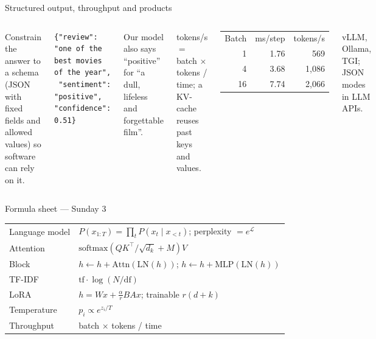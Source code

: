 \documentclass[aspectratio=169,11pt]{beamer}
\begin{document}
\begin{frame}[fragile]{Structured output, throughput and products}
\begin{columns}[T]
\begin{bdef}
Constrain the answer to a schema (JSON with fixed fields and allowed values) so software can rely on it.
\end{bdef}
\begin{bcode}
\begin{lstlisting}
{"review": "one of the best movies of the year",
 "sentiment": "positive", "confidence": 0.51}
\end{lstlisting}
\end{bcode}
\begin{bwarn}
Our model also says ``positive'' for ``a dull, lifeless and forgettable film''.
\end{bwarn}
\begin{bmath}[Throughput]
tokens/s $=$ batch $\times$ tokens / time; a KV-cache reuses past keys and values.
\end{bmath}
\begin{bres}
\begin{tabular}{rrr}
Batch & ms/step & tokens/s\\
1 & 1.76 & 569\\
4 & 3.68 & 1,086\\
16 & 7.74 & 2,066\\
\end{tabular}
\end{bres}
\begin{bapp}
vLLM, Ollama, TGI; JSON modes in LLM APIs.
\end{bapp}
\end{columns}
\end{frame}

\begin{frame}{Formula sheet --- Sunday 3}
\renewcommand{\arraystretch}{1.35}
\begin{tabularx}{\linewidth}{l X}
\toprule
Language model & $P(x_{1:T})=\prod_tP(x_t\mid x_{<t})$; \; perplexity $=e^{\mathcal{L}}$\\
Attention & $\mathrm{softmax}(QK^\top/\sqrt{d_k}+M)V$\\
Block & $h\leftarrow h+\mathrm{Attn}(\mathrm{LN}(h))$; \; $h\leftarrow h+\mathrm{MLP}(\mathrm{LN}(h))$\\
TF-IDF & $\mathrm{tf}\cdot\log(N/\mathrm{df})$\\
LoRA & $h=Wx+\frac{\alpha}{r}BAx$; \; trainable $r(d+k)$\\
Temperature & $p_i\propto e^{z_i/T}$\\
Throughput & batch $\times$ tokens / time\\
\bottomrule
\end{tabularx}
\end{frame}
\end{document}
